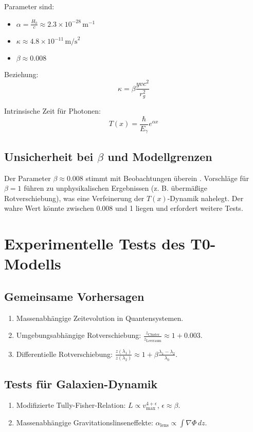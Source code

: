 \documentclass[a4paper,12pt]{article}
\theoremstyle{definition}
\theoremstyle{remark}
\newcommand{\Tfield}{T(x)}
\begin{document}
	Parameter sind:
	\begin{itemize}
		\item \(\alpha = \frac{H_0}{c} \approx 2.3 \times 10^{-28} \, \text{m}^{-1}\)
		\item \(\kappa \approx 4.8 \times 10^{-11} \, \text{m/s}^2\)
		\item \(\beta \approx 0.008\)
	\end{itemize}
	
	Beziehung:
	\begin{equation}
		\kappa = \beta \frac{y v c^2}{r_g^2}
	\end{equation}
	
	Intrinsische Zeit für Photonen:
	\begin{equation}
		\Tfield = \frac{\hbar}{E_{\gamma}} e^{\alpha x}
	\end{equation}
	
	\subsection{Unsicherheit bei \(\beta\) und Modellgrenzen}
	Der Parameter \(\beta \approx 0.008\) stimmt mit Beobachtungen überein \cite{pascher_params_2025}. Vorschläge für \(\beta = 1\) \cite{pascher_temp_2025} führen zu unphysikalischen Ergebnissen (z. B. übermäßige Rotverschiebung), was eine Verfeinerung der \(\Tfield\)-Dynamik nahelegt. Der wahre Wert könnte zwischen 0.008 und 1 liegen und erfordert weitere Tests.
	
	\section{Experimentelle Tests des T0-Modells}
	
	\subsection{Gemeinsame Vorhersagen}
	\begin{enumerate}
		\item Massenabhängige Zeitevolution in Quantensystemen.
		\item Umgebungsabhängige Rotverschiebung: \(\frac{z_{\text{Cluster}}}{z_{\text{Leerraum}}} \approx 1 + 0.003\).
		\item Differentielle Rotverschiebung: \(\frac{z(\lambda_1)}{z(\lambda_2)} \approx 1 + \beta \frac{\lambda_1 - \lambda_2}{\lambda_0}\).
	\end{enumerate}
	
	\subsection{Tests für Galaxien-Dynamik}
	\begin{enumerate}
		\item Modifizierte Tully-Fisher-Relation: \(L \propto v_{\text{max}}^{4 + \epsilon}\), \(\epsilon \approx \beta\).
		\item Massenabhängige Gravitationslinseneffekte: \(\alpha_{\text{lens}} \propto \int \nabla \Phi \, dz\).
	\end{enumerate}
	
\end{document}
